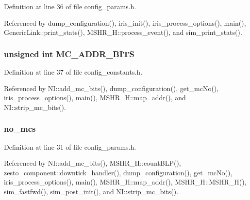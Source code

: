 Definition at line 36 of file config\_\-params.h.

Referenced by dump\_\-configuration(), iris\_\-init(), iris\_\-process\_\-options(), main(), GenericLink::print\_\-stats(), MSHR\_\-H::process\_\-event(), and sim\_\-print\_\-stats().
\subsubsection[{MC\_\-ADDR\_\-BITS}]{\setlength{\rightskip}{0pt plus 5cm}unsigned int {\bf MC\_\-ADDR\_\-BITS}}\label{mshr_8h_5797f7fc969d8a7c02df4ba708ed734f}




Definition at line 37 of file config\_\-constants.h.

Referenced by NI::add\_\-mc\_\-bits(), dump\_\-configuration(), get\_\-mcNo(), iris\_\-process\_\-options(), main(), MSHR\_\-H::map\_\-addr(), and NI::strip\_\-mc\_\-bits().
\subsubsection[{no\_\-mcs}]{ {\bf no\_\-mcs}}\label{mshr_8h_56d27d790e05179f3787fce80d802d04}




Definition at line 31 of file config\_\-params.h.

Referenced by NI::add\_\-mc\_\-bits(), MSHR\_\-H::countBLP(), zesto\_\-component::downtick\_\-handler(), dump\_\-configuration(), get\_\-mcNo(), iris\_\-process\_\-options(), main(), MSHR\_\-H::map\_\-addr(), MSHR\_\-H::MSHR\_\-H(), sim\_\-fastfwd(), sim\_\-post\_\-init(), and NI::strip\_\-mc\_\-bits().